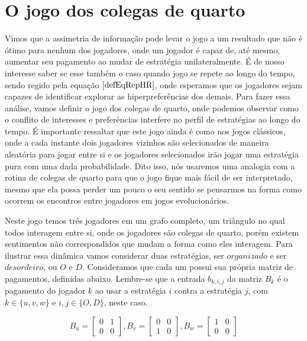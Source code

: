 \chapter{O jogo dos colegas de quarto}

Vimos que a assimetria de informação pode levar o jogo a um resultado que não é ótimo para nenhum dos jogadores, onde um jogador é capaz de, até mesmo, aumentar seu pagamento ao mudar de estratégia unilateralmente. É de nosso interesse saber se esse também o caso quando jogo se repete ao longo do tempo, sendo regido pela equação $\eqref{defEqRepHR}$, onde esperamos que os jogadores sejam capazes de identificar explorar as hiperpreferências dos demais. Para fazer essa análise, vamos definir o jogo dos colegas de quarto, onde podemos observar como o conflito de interesses e preferências interfere no perfil de estratégias ao longo do tempo. É importante ressaltar que este jogo ainda é como nos jogos clássicos, onde a cada instante dois jogadores vizinhos são selecionados de maneira aleatória para jogar entre si e os jogadores selecionados irão jogar uma estratégia pura com uma dada probabilidade. Dito isso, nós usaremos uma analogia com a rotina de colegas de quarto para que o jogo fique mais fácil de ser interpretado, mesmo que ela possa perder um pouco o seu sentido se pensarmos na forma como ocorrem os encontros entre jogadores em jogos evolucionários.

Neste jogo temos três jogadores em um grafo completo, um triângulo no qual todos interagem entre si, onde os jogadores são colegas de quarto, porém existem sentimentos não correspondidos que mudam a forma como eles interagem. Para ilustrar essa dinâmica vamos considerar duas estratégias, ser $\textit{organizado}$ e ser $\textit{desordeiro}$, ou $O$ e $D$. Consideramos que cada um possui sua própria matriz de pagamentos, definidas abaixo. Lembre-se que a entrada $b_{k,i,j}$ da matriz $B_k$ é o pagamento do jogador $k$ ao usar a estratégia $i$ contra a estratégia $j$, com $k\in\{u,v,w\}$ e $i,j\in\{O,D\}$, neste caso.

\begin{equation}
    \label{payoffLoveTri}
    B_u=
    \begin{bmatrix}
        0 & 1\\ 
        0 & 0 
    \end{bmatrix},
    B_v=
    \begin{bmatrix}
        0 & 0\\ 
        1 & 0 
    \end{bmatrix},
    B_w=
    \begin{bmatrix}
        1 & 0\\ 
        0 & 0 
    \end{bmatrix}
\end{equation}

